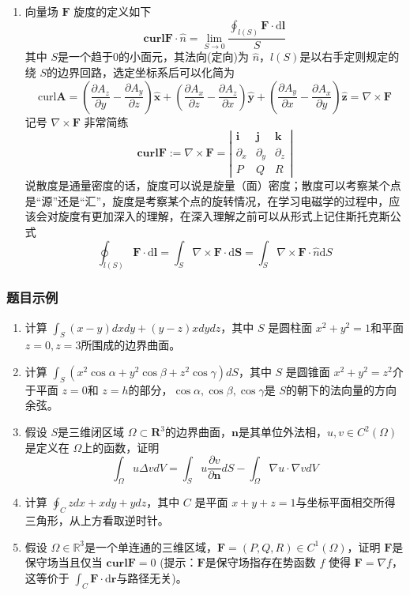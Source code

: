 \begin{enumerate}
    \item 向量场 $\mathbf{F}$ 旋度的定义如下
    \[
        \mathbf{curl F} \cdot \hat{n} = \lim _{S \to 0} \frac{\oint _{l(S)} \mathbf{F} \cdot \mathrm{d} \mathbf{l}}{S}
    \]
    其中 $S$是一个趋于0的小面元，其法向(定向)为 $\hat{n}$，$l(S)$是以右手定则规定的绕 $S$的边界回路，选定坐标系后可以化简为
    \[
        \mathrm{curl}\boldsymbol{A}=\left(\frac{\partial A_{z}}{\partial y}-\frac{\partial A_{y}}{\partial z}\right)\boldsymbol{\hat{x}}+\left(\frac{\partial A_{x}}{\partial z}-\frac{\partial A_{z}}{\partial x}\right)\boldsymbol{\hat{y}}+\left(\frac{\partial A_{y}}{\partial x}-\frac{\partial A_{x}}{\partial y}\right)\boldsymbol{\hat{z}}
        = \nabla \times \mathbf{F}
    \]
    记号 $\nabla \times \mathbf{F}$ 非常简练
    \[
    \left.\mathbf{curl F}:=\nabla\times\mathbf{F}=\left|\begin{array}{ccc}\mathbf{i}&\mathbf{j}&\mathbf{k}\\\partial_x&\partial_y&\partial_z\\P&Q&R\end{array}\right.\right|
    \]
    说散度是通量密度的话，旋度可以说是旋量（面）密度；散度可以考察某个点是“源”还是“汇”，旋度是考察某个点的旋转情况，在学习电磁学的过程中，应该会对旋度有更加深入的理解，在深入理解之前可以从形式上记住斯托克斯公式
    \[
        \oint _{l(S)} \mathbf{F} \cdot \mathrm{d} \mathbf{l} = \int _S \nabla \times \mathbf{F} \cdot \mathrm{d} \mathbf{S} = \int _S \nabla \times \mathbf{F} \cdot \hat{n} \mathrm{d} S
    \]
\end{enumerate}

\subsubsection{题目示例}
\begin{enumerate}
    \item 计算 $\int _S (x-y) dx dy + (y-z)x dydz $，其中 $S$ 是圆柱面 $x^2 + y^2 =1$和平面 $z=0, z=3$所围成的边界曲面。

    \item 计算 $\int _S (x^2\cos\alpha+y^2\cos\beta+z^2\cos\gamma)dS$，其中 $S$ 是圆锥面 $x^2 + y^2 =z^2$介于平面 $z=0$和 $z=h$的部分，$\cos \alpha, \cos \beta, \cos \gamma$是 $S$的朝下的法向量的方向余弦。
    
    \item 假设 $S$是三维闭区域 $\Omega \subset \mathbf{R}^3$的边界曲面，$\mathbf{n}$是其单位外法相，$u,v\in C^2(\Omega)$是定义在 $\Omega$上的函数，证明
    \[
        \int_\Omega u\Delta vdV=\int_Su\frac{\partial v}{\partial\mathbf{n}}dS-\int_\Omega\nabla u\cdot\nabla vdV
    \]

    \item 计算 $\oint _C zdx+xdy+ydz$，其中 $C$ 是平面 $x+y+z=1$与坐标平面相交所得三角形，从上方看取逆时针。

    \item 假设 $\Omega \in \mathbb{R}^3$是一个单连通的三维区域，$\mathbf{F} = (P,Q,R) \in C^1(\Omega)$，证明 $\mathbf{F}$是保守场当且仅当 $\mathbf{curl F} = 0$ (提示：$\mathbf{F}$是保守场指存在势函数 $f$ 使得 $\mathbf{F} = \nabla f$，这等价于 $\int _C \mathbf{F} \cdot \mathrm{d} \mathbf{r}$与路径无关)。
\end{enumerate}

